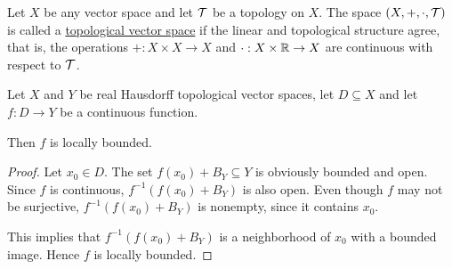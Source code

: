 \begin{definition}\label{def:topological_vector_space}
  Let $X$ be any vector space and let $\mathcal T$ be a topology on $X$. The space $(X, +, \cdot, \mathcal T)$ is called a \uline{topological vector space} if the linear and topological structure agree, that is, the operations $+: X \times X \to X$ and $\cdot: X \times \mathbb R \to X$ are continuous with respect to $\mathcal T$.
\end{definition}

\begin{proposition}\label{thm:continuous_implies_locally_bounded}
  Let $X$ and $Y$ be real Hausdorff topological vector spaces, let $D \subseteq X$ and let $f: D \to Y$ be a continuous function.

  Then $f$ is locally bounded.
\end{proposition}
\begin{proof}
  Let $x_0 \in D$. The set $f(x_0) + B_Y \subseteq Y$ is obviously bounded and open. Since $f$ is continuous, $f^{-1}(f(x_0) + B_Y)$ is also open. Even though $f$ may not be surjective, $f^{-1}(f(x_0) + B_Y)$ is nonempty, since it contains $x_0$.

  This implies that $f^{-1}(f(x_0) + B_Y)$ is a neighborhood of $x_0$ with a bounded image. Hence $f$ is locally bounded.
\end{proof}
